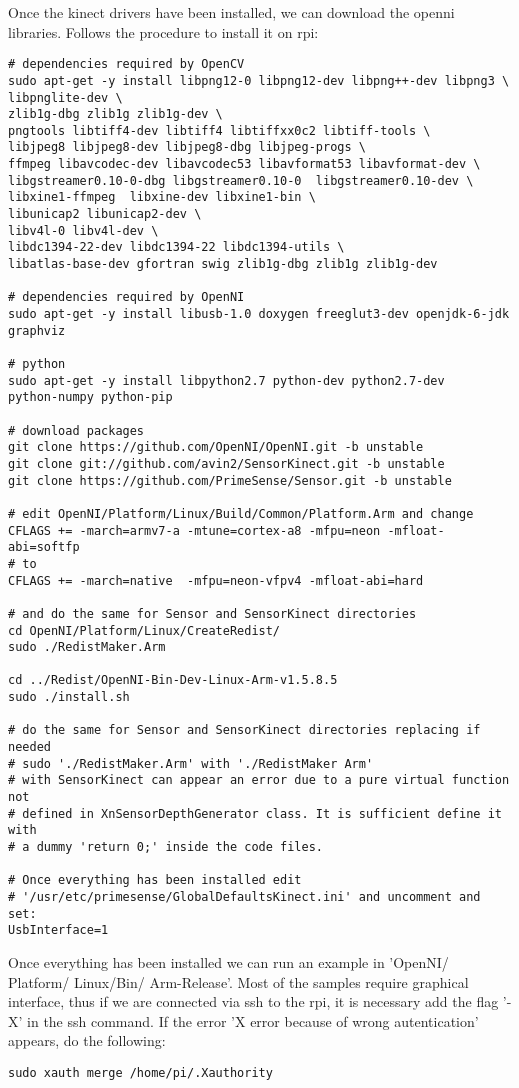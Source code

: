 Once the kinect drivers have been installed, we can download the openni libraries. Follows the procedure to install it on rpi:
\begin{verbatim}
# dependencies required by OpenCV
sudo apt-get -y install libpng12-0 libpng12-dev libpng++-dev libpng3 \
libpnglite-dev \
zlib1g-dbg zlib1g zlib1g-dev \
pngtools libtiff4-dev libtiff4 libtiffxx0c2 libtiff-tools \
libjpeg8 libjpeg8-dev libjpeg8-dbg libjpeg-progs \
ffmpeg libavcodec-dev libavcodec53 libavformat53 libavformat-dev \
libgstreamer0.10-0-dbg libgstreamer0.10-0  libgstreamer0.10-dev \
libxine1-ffmpeg  libxine-dev libxine1-bin \
libunicap2 libunicap2-dev \
libv4l-0 libv4l-dev \
libdc1394-22-dev libdc1394-22 libdc1394-utils \
libatlas-base-dev gfortran swig zlib1g-dbg zlib1g zlib1g-dev

# dependencies required by OpenNI
sudo apt-get -y install libusb-1.0 doxygen freeglut3-dev openjdk-6-jdk 
graphviz

# python
sudo apt-get -y install libpython2.7 python-dev python2.7-dev 
python-numpy python-pip

# download packages
git clone https://github.com/OpenNI/OpenNI.git -b unstable 
git clone git://github.com/avin2/SensorKinect.git -b unstable
git clone https://github.com/PrimeSense/Sensor.git -b unstable

# edit OpenNI/Platform/Linux/Build/Common/Platform.Arm and change
CFLAGS += -march=armv7-a -mtune=cortex-a8 -mfpu=neon -mfloat-abi=softfp 
# to
CFLAGS += -march=native  -mfpu=neon-vfpv4 -mfloat-abi=hard

# and do the same for Sensor and SensorKinect directories
cd OpenNI/Platform/Linux/CreateRedist/
sudo ./RedistMaker.Arm

cd ../Redist/OpenNI-Bin-Dev-Linux-Arm-v1.5.8.5
sudo ./install.sh

# do the same for Sensor and SensorKinect directories replacing if needed
# sudo './RedistMaker.Arm' with './RedistMaker Arm'
# with SensorKinect can appear an error due to a pure virtual function not
# defined in XnSensorDepthGenerator class. It is sufficient define it with
# a dummy 'return 0;' inside the code files.

# Once everything has been installed edit 
# '/usr/etc/primesense/GlobalDefaultsKinect.ini' and uncomment and set:
UsbInterface=1
\end{verbatim}
Once everything has been installed we can run an example in 'OpenNI/ Platform/ Linux/Bin/ Arm-Release'. Most of the samples require graphical interface, thus if we are connected via ssh to the rpi, it is necessary add the flag '-X' in the ssh command. If the error 'X error because of wrong autentication' appears, do the following:
\begin{verbatim}
sudo xauth merge /home/pi/.Xauthority
\end{verbatim}

